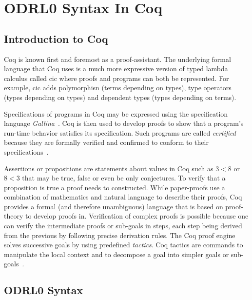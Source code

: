 \chapter{ODRL0 Syntax In Coq}\label{chap:odrl0syntaxcoq}

\section{Introduction to Coq}

Coq is known first and foremost as a proof-assistant. The underlying formal language that Coq uses is a much more expressive version of typed lambda calculus called \ac{cic} where proofs and programs can both be represented. For example, \ac{cic} adds polymorphisn (terms depending on types), type operators (types depending on types) and dependent types (types depending on terms).

Specifications of programs in Coq may be expressed using the specification language \emph{Gallina}~\cite{gallinaref}. Coq is then used to develop proofs to show that a program's run-time behavior satisfies its specification. Such programs are called \emph{certified} because they are formally verified and confirmed to conform to their specifications~\cite{BC04}.

Assertions or propositions are statements about values in Coq such as $3<8$ or $8<3$ that may be true, false or even be only conjectures. To verify that a proposition is true a proof needs to constructed. While paper-proofs use a combination of mathematics and natural language to describe their proofs, Coq provides a formal (and therefore unambiguous) language that is based on proof-theory to develop proofs in. Verification of complex proofs is possible because one can verify the intermediate proofs or sub-goals in steps, each step being derived from the previous by following precise derivation rules. The Coq proof engine solves successive goals by using predefined \emph{tactics}. Coq tactics are commands to manipulate the local context and to decompose a goal into simpler goals or sub-goals~\cite{BC04}.

\section{ODRL0 Syntax}\label{sec:agreementConstructor}

